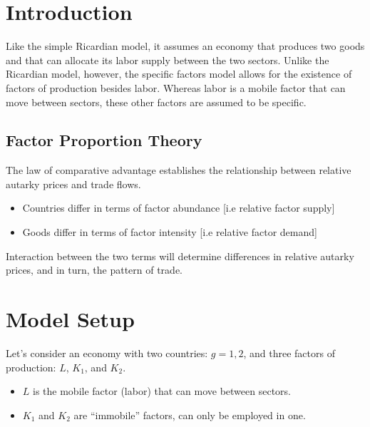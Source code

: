 \section{Introduction}

Like the simple Ricardian model, it assumes an economy that produces two goods and that
can allocate its labor supply between the two sectors. Unlike the Ricardian model,
however, the specific factors model allows for the existence of factors of production
besides labor. Whereas labor is a mobile factor that can move between sectors, these
other factors are assumed to be specific. 

\subsection{Factor Proportion Theory}

The law of comparative advantage establishes the relationship between relative autarky prices and trade flows.

\begin{itemize}
    \item Countries differ in terms of factor abundance [i.e relative factor
    supply]
    \item Goods differ in terms of factor intensity [i.e relative factor demand]
\end{itemize}

Interaction between the two terms will determine differences in relative autarky prices, and in turn, the pattern of trade.


\section{Model Setup}

Let's consider an economy with two countries: $g=1,2$, and three factors of production: $L$, $K_1$, and $K_2$. 
\begin{itemize}
    \item $L$ is the mobile factor (labor) that can move between sectors.
    \item $K_1$ and $K_2$ are  ``immobile'' factors, can only be employed in one.
\end{itemize}

